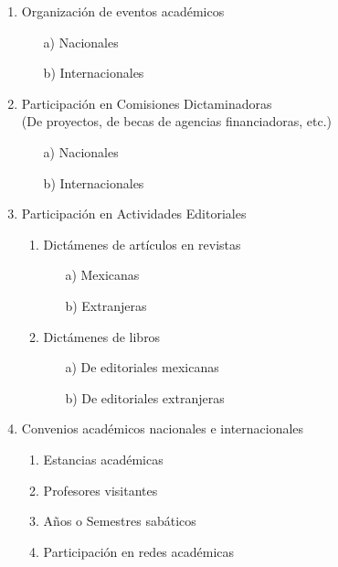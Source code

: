 \documentclass[12pt]{report}
\begin{document}
\begin{enumerate}
\begin{enumerate}
\begin{enumerate}
            	\end{enumerate}
         	\item Organización de eventos académicos
         		\begin{itemize}
         		\item[a)] Nacionales
        		\item[b)] Internacionales \\
         		\end{itemize}
        	\item Participación en Comisiones Dictaminadoras\\ {\small (De proyectos, de becas de agencias financiadoras, etc.)}
        		\begin{itemize}
        		\item[a)] Nacionales
        		\item[b)] Internacionales \\
        		\end{itemize}
        	\item Participación en Actividades Editoriales
        		\begin{enumerate}
        		\item Dictámenes de artículos en revistas
        			\begin{itemize}
        			\item[a)] Mexicanas
        			\item[b)] Extranjeras
        			\end{itemize}
        		\item Dictámenes de libros
        			\begin{itemize}
        			\item[a)] De editoriales mexicanas
        			\item[b)] De editoriales extranjeras \\
        			\end{itemize}
        		\end{enumerate}
        	\item Convenios académicos nacionales e internacionales
        		\begin{enumerate}
        		\item Estancias académicas
        		\item Profesores visitantes
        		\item Años o Semestres sabáticos
        		\item Participación en redes académicas \\
        		\end{enumerate}

\end{enumerate}
\end{enumerate}
\end{document}
